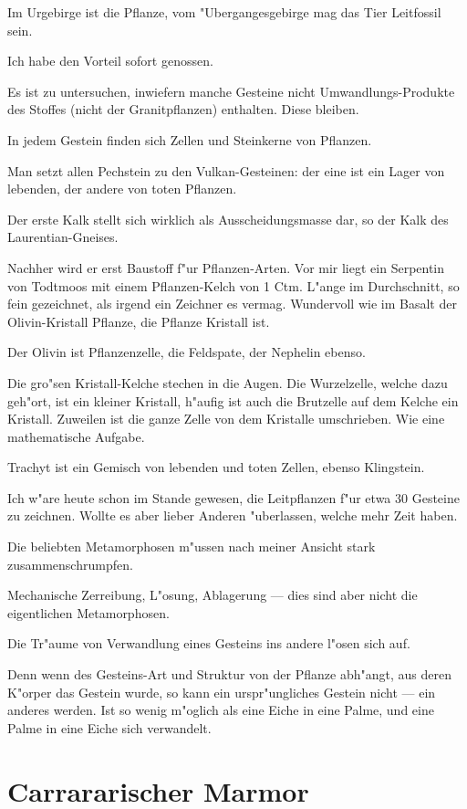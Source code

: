 \documentclass[a4paper, 11pt, oneside, german]{article}
\begin{document}
Im Urgebirge ist die Pflanze, vom "Ubergangesgebirge mag das Tier Leitfossil sein.

Ich habe den Vorteil sofort genossen.

Es ist zu untersuchen, inwiefern manche Gesteine nicht Umwandlungs-Produkte des Stoffes (nicht der Granitpflanzen) enthalten. Diese bleiben.

In jedem Gestein finden sich Zellen und Steinkerne von Pflanzen.

Man setzt allen Pechstein zu den Vulkan-Gesteinen: der eine ist ein Lager von lebenden, der andere von toten Pflanzen.

Der erste Kalk stellt sich wirklich als Ausscheidungsmasse dar, so der Kalk des Laurentian-Gneises.

Nachher wird er erst Baustoff f"ur Pflanzen-Arten. Vor mir liegt ein Serpentin von Todtmoos mit einem Pflanzen-Kelch von 1 Ctm. L"ange im Durchschnitt, so fein gezeichnet, als irgend ein Zeichner es vermag. Wundervoll wie im Basalt der Olivin-Kristall Pflanze, die Pflanze Kristall ist.

Der Olivin ist Pflanzenzelle, die Feldspate, der Nephelin ebenso.

Die gro"sen Kristall-Kelche stechen in die Augen. Die Wurzelzelle, welche dazu geh"ort, ist ein kleiner Kristall, h"aufig ist auch die Brutzelle auf dem Kelche ein Kristall. Zuweilen ist die ganze Zelle von dem Kristalle umschrieben. Wie eine mathematische Aufgabe.

Trachyt ist ein Gemisch von lebenden und toten Zellen, ebenso Klingstein.

Ich w"are heute schon im Stande gewesen, die Leitpflanzen f"ur etwa 30 Gesteine zu zeichnen. Wollte es aber lieber Anderen "uberlassen, welche mehr Zeit haben.

Die beliebten Metamorphosen m"ussen nach meiner Ansicht stark zusammenschrumpfen.

Mechanische Zerreibung, L"osung, Ablagerung --- dies sind aber nicht die eigentlichen Metamorphosen.

Die Tr"aume von Verwandlung eines Gesteins ins andere l"osen sich auf.

Denn wenn des Gesteins-Art und Struktur von der Pflanze abh"angt, aus deren K"orper das Gestein wurde, so kann ein urspr"ungliches Gestein nicht --- ein anderes werden. Ist so wenig m"oglich als eine Eiche in eine Palme, und eine Palme in eine Eiche sich verwandelt.
\clearpage
\section{Carrararischer Marmor}
\end{document}
